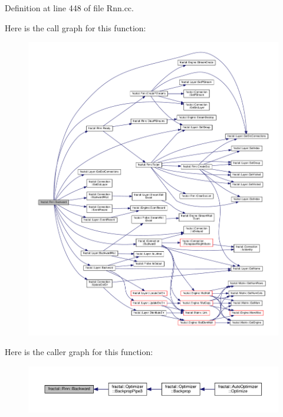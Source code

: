 Definition at line 448 of file Rnn.\+cc.



Here is the call graph for this function\+:\nopagebreak
\begin{figure}[H]
\begin{center}
\leavevmode
\includegraphics[width=350pt]{de/dca/classfractal_1_1Rnn_ad0221aacc16940ec45bb5fef7a5106e5_cgraph}
\end{center}
\end{figure}




Here is the caller graph for this function\+:\nopagebreak
\begin{figure}[H]
\begin{center}
\leavevmode
\includegraphics[width=350pt]{de/dca/classfractal_1_1Rnn_ad0221aacc16940ec45bb5fef7a5106e5_icgraph}
\end{center}
\end{figure}


